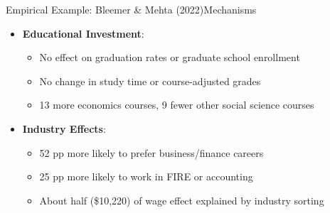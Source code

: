 \documentclass[dvipsnames,hyperref={pdfpagelabels=false}]{beamer}
\begin{document}
\begin{frame}{Empirical Example: Bleemer \& Mehta (2022)}{Mechanisms}
	\begin{itemize}
		\item \textbf{Educational Investment}:
										\vspace{0.2cm}
		\begin{itemize}
			\item No effect on graduation rates or graduate school enrollment
											\vspace{0.2cm}
			\item No change in study time or course-adjusted grades
											\vspace{0.2cm}
			\item 13 more economics courses, 9 fewer other social science courses
											\vspace{0.2cm}
		\end{itemize}
		
		\vspace{0.2cm}
		\item \textbf{Industry Effects}:
										\vspace{0.2cm}
		\begin{itemize}
			\item 52 pp more likely to prefer business/finance careers
											\vspace{0.2cm}
			\item 25 pp more likely to work in FIRE or accounting
											\vspace{0.2cm}
			\item About half (\$10,220) of wage effect explained by industry sorting
		\end{itemize}
		
		\vspace{0.2cm}
	\end{itemize}
\end{frame}
\end{document}
